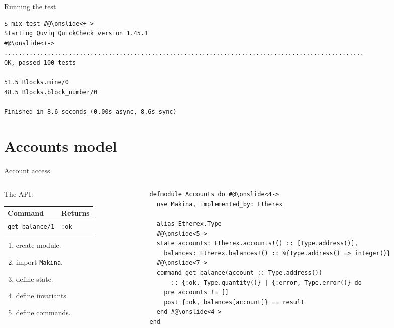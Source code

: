 \documentclass[aspectratio=169, 10pt]{beamer}
\begin{document}
\begin{frame}[label={sec:org6246bbe},fragile]{Running the test}
 \onslide<+->
\onslide<+->
\lstset{language=bash,label= ,caption= ,captionpos=b,numbers=none,style=shell}
\begin{lstlisting}
$ mix test #@\onslide<+->
Starting Quviq QuickCheck version 1.45.1
#@\onslide<+->
....................................................................................................
OK, passed 100 tests

51.5 Blocks.mine/0
48.5 Blocks.block_number/0

Finished in 8.6 seconds (0.00s async, 8.6s sync)
\end{lstlisting}
\end{frame}

\section{Accounts model}
\label{sec:org3a1b460}
\begin{frame}[label={sec:orge0e3d10},fragile]{Account access}
 \begin{columns}
\begin{column}{0.28\columnwidth}
\onslide<+->
\onslide<+->
The API:

\begin{center}
\begin{tabular}{ll}
Command & Returns\\
\hline
\texttt{get\_balance/1} & \texttt{:ok}\\
\end{tabular}
\end{center}
\onslide<+->
\vspace{0.5cm}
\begin{enumerate}
\item create module.
\onslide<+->
\item import \texttt{Makina}.
\onslide<+->
\item define state.
\onslide<+->
\item define invariants.
\onslide<+->
\item define commands.
\end{enumerate}
\end{column}

\begin{column}{0.68\columnwidth}
\lstset{language=elixir,label= ,caption= ,captionpos=b,numbers=none,style=display}
\begin{lstlisting}
defmodule Accounts do #@\onslide<4->
  use Makina, implemented_by: Etherex

  alias Etherex.Type
  #@\onslide<5->
  state accounts: Etherex.accounts!() :: [Type.address()],
	balances: Etherex.balances!() :: %{Type.address() => integer()}
  #@\onslide<7->
  command get_balance(account :: Type.address())
      :: {:ok, Type.quantity()} | {:error, Type.error()} do
    pre accounts != []
    post {:ok, balances[account]} == result
  end #@\onslide<4->
end
\end{lstlisting}
\end{column}
\end{columns}
\end{frame}
\end{document}

